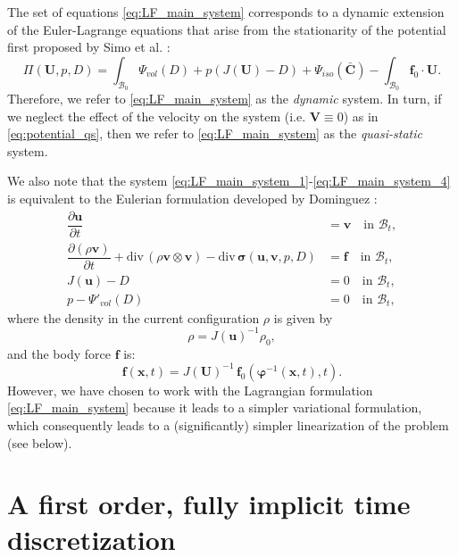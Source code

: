 \documentclass{sfuthesis}
\numberwithin{equation}{section}
\numberwithin{figure}{chapter}
\numberwithin{table}{chapter}
\theoremstyle{definition}
\def\*#1{{\mathbf{#1}}} %
\newcommand{\pder}[2]{\dfrac{\partial #1}{\partial #2}}
\newcommand{\divt}[1]{{\bm{\mathrm{div}} \, #1}}
\newcommand{\B}{\mathcal{B}}
\def\bsigma{{\bm{\sigma}}}
\begin{document}
The set of equations \eqref{eq:LF_main_system} corresponds to a dynamic extension of the Euler-Lagrange equations that arise from the stationarity of the potential first proposed by Simo et al. \cite{SimoTaylorPister1985}:
\begin{equation} \label{eq:potential_qs}
    \Pi(\*U,p,D) = \int_{\B_0} \Psi_{vol}(D) + p(J(\*U) - D) + \Psi_{iso}(\bar{\*C}) - \int_{\B_0} \*f_0 \cdot \*U.
\end{equation}
Therefore, we refer to \eqref{eq:LF_main_system} as the \textit{dynamic} system. In turn, if we neglect the effect of the velocity on the system (i.e. $\*V \equiv 0$) as in \eqref{eq:potential_qs}, then we refer to \eqref{eq:LF_main_system} as the \textit{quasi-static} system.

We also note that the system \eqref{eq:LF_main_system_1}-\eqref{eq:LF_main_system_4} is equivalent to the Eulerian formulation developed by Dominguez \cite{Seba}:
\begin{subequations} \label{eq:EF_main}
    \begin{align}
    \label{eq:EF_1}\pder{\*u}{t} &= \*v  \quad \text{in } \B_t,\\
    \label{eq:EF_2}\pder{(\rho \*v)}{t} + \divt{(\rho \*v \otimes \*v)} - \divt{\bsigma(\*u,\*v,p,D)} &= \*f \quad \text{in } \B_t, \\
    \label{eq:EF_3}J(\*u)-D &= 0 \quad \text{in } \B_t, \\
    \label{eq:EF_4}p-\Psi'_{vol}(D) &= 0 \quad \text {in } \B_t,
    \end{align}
\end{subequations}
where the density in the current configuration $\rho$ is given by
\begin{equation}
    \rho = J(\*u)^{-1} \rho_0,
\end{equation}
and the body force $\*f$ is:
\begin{equation}
    \*f(\*x,t) = J(\*U)^{-1} \, \*f_0(\bm{\varphi}^{-1}(\*x,t),t).
\end{equation}
However, we have chosen to work with the Lagrangian formulation \eqref{eq:LF_main_system} because it leads to a simpler variational formulation, which consequently leads to a (significantly) simpler linearization of the problem (see below).

\section{A first order, fully implicit time discretization}
\end{document}

